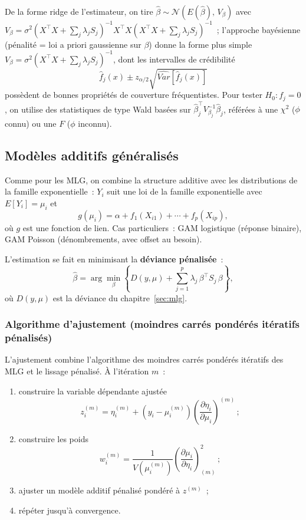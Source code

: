 \documentclass[11pt,letterpaper]{article}
\begin{document}
De la forme ridge de l'estimateur, on tire $\hat\beta\sim\mathcal{N}(E(\hat\beta),\, V_\beta)$ avec $V_\beta = \sigma^2(X^\top X + \sum_j\lambda_j S_j)^{-1}X^\top X(X^\top X + \sum_j\lambda_j S_j)^{-1}$~; l'approche bayésienne (pénalité = loi a priori gaussienne sur $\beta$) donne la forme plus simple $V_\beta = \sigma^2(X^\top X + \sum_j\lambda_j S_j)^{-1}$, dont les intervalles de crédibilité
$$\hat f_j(x) \pm z_{\alpha/2}\sqrt{\widehat{Var}[\hat f_j(x)]}$$
possèdent de bonnes propriétés de couverture fréquentistes. Pour tester $H_0: f_j = 0$, on utilise des statistiques de type Wald basées sur $\hat\beta_j^\top V_{\beta_j}^{-1}\hat\beta_j$, référées à une $\chi^2$ ($\phi$ connu) ou une $F$ ($\phi$ inconnu).

\subsection{Modèles additifs généralisés}

Comme pour les MLG, on combine la structure additive avec les distributions de la famille exponentielle~: $Y_i$ suit une loi de la famille exponentielle avec $E[Y_i] = \mu_i$ et
$$g(\mu_i) = \alpha + f_1(X_{i1}) + \cdots + f_p(X_{ip}),$$
où $g$ est une fonction de lien. Cas particuliers~: GAM logistique (réponse binaire), GAM Poisson (dénombrements, avec offset au besoin).

L'estimation se fait en minimisant la \textbf{déviance pénalisée}~:
$$\hat\beta = \arg\min_\beta\left\{D(y,\mu) + \sum_{j=1}^p\lambda_j\,\beta^\top S_j\,\beta\right\},$$
où $D(y,\mu)$ est la déviance du chapitre~\ref{sec:mlg}.

\subsubsection{Algorithme d'ajustement (moindres carrés pondérés itératifs pénalisés)}

L'ajustement combine l'algorithme des moindres carrés pondérés itératifs des MLG et le lissage pénalisé. À l'itération $m$~:
\begin{enumerate}
\item construire la variable dépendante ajustée
$$z_i^{(m)} = \eta_i^{(m)} + (y_i - \mu_i^{(m)})\left(\frac{\partial\eta_i}{\partial\mu_i}\right)^{(m)}\,;$$
\item construire les poids
$$w_i^{(m)} = \frac{1}{V(\mu_i^{(m)})}\left(\frac{\partial\mu_i}{\partial\eta_i}\right)^2_{(m)}\,;$$
\item ajuster un modèle additif pénalisé pondéré à $z^{(m)}$~;
\item répéter jusqu'à convergence.
\end{enumerate}
\end{document}
